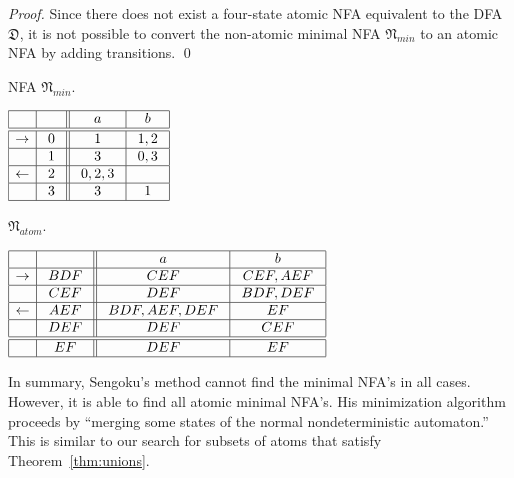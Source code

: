 \documentclass{llncs}
\newcommand{\fD}{{\mathfrak D}}
\newcommand{\fN}{{\mathfrak N}}
\begin{document}
\begin{proof}
Since there does not exist a four-state atomic NFA equivalent to the DFA $\fD$,
it is not possible to convert the non-atomic 
minimal NFA $\fN_{min}$ to an atomic NFA by adding transitions.
\qed
\end{proof}

\begin{table}[t]
\vskip-0.5cm
\begin{minipage}[b]{0.3\linewidth}
\caption{NFA $\fN_{min}$.}
\label{tab:n_mp}
\begin{center}
$
\begin{array}{|c|c|| c|c|}    
\hline
 & & \  a \
& \ b \  \\
\hline
\hline
\rightarrow & 0 
& \ 1 \ & 1,2  \\
\hline  
 & 1 
 & 3 & \  0,3 \ \\
\hline  
\leftarrow & \ 2 \ 
& \ 0,2,3 \ &  \\
\hline  
 & \ 3 \ 
& \ 3 \ & 1 \\
\hline  
\end{array}
$
\end{center}
\end{minipage}
\hspace{0.5cm}
\begin{minipage}[b]{0.45\linewidth}
\caption{$\fN_{atom}$.}
\label{tab:n5_mp}
\begin{center}
$
\begin{array}{|c| c||c| c| }    
\hline
& \ \  \ \ 
&\ \ a \ \ &\ \ b \ \   \\
\hline  
\rightarrow & BDF
& CEF &CEF,AEF  \\
\hline  
 & \ CEF \
& DEF  & \ BDF,DEF \  \\
\hline  
\leftarrow & AEF
&  \ BDF, AEF, DEF \ & EF  \\
\hline  
 & \ DEF \
& DEF  & \ CEF \  \\
\hline  \hline
 & \ EF \
&\ DEF  \ & EF \\
\hline  
\end{array}
$
\end{center}
\end{minipage}
\vskip-0.3cm
\end{table}

\vskip-0.1cm
In summary, Sengoku's method cannot find the minimal NFA's in all cases. 
However, it is able to find all atomic minimal NFA's.
His minimization algorithm proceeds by 
``merging some states of the normal nondeterministic automaton.''
This is similar to our search for subsets of atoms that satisfy 
Theorem~\ref{thm:unions}.
\end{document}
